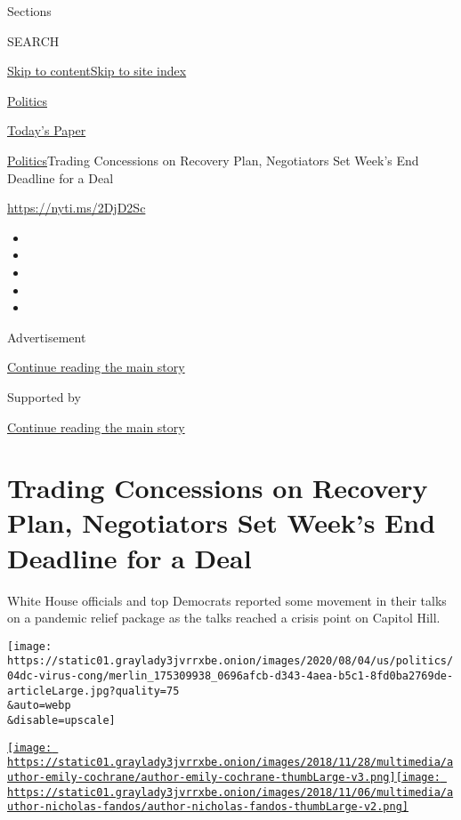 Sections

SEARCH

\protect\hyperlink{site-content}{Skip to
content}\protect\hyperlink{site-index}{Skip to site index}

\href{https://www.nytimes3xbfgragh.onion/section/politics}{Politics}

\href{https://myaccount.nytimes3xbfgragh.onion/auth/login?response_type=cookie\&client_id=vi}{}

\href{https://www.nytimes3xbfgragh.onion/section/todayspaper}{Today's
Paper}

\href{/section/politics}{Politics}\textbar{}Trading Concessions on
Recovery Plan, Negotiators Set Week's End Deadline for a Deal

\url{https://nyti.ms/2DjD2Sc}

\begin{itemize}
\item
\item
\item
\item
\item
\end{itemize}

Advertisement

\protect\hyperlink{after-top}{Continue reading the main story}

Supported by

\protect\hyperlink{after-sponsor}{Continue reading the main story}

\hypertarget{trading-concessions-on-recovery-plan-negotiators-set-weeks-end-deadline-for-a-deal}{%
\section{Trading Concessions on Recovery Plan, Negotiators Set Week's
End Deadline for a
Deal}\label{trading-concessions-on-recovery-plan-negotiators-set-weeks-end-deadline-for-a-deal}}

White House officials and top Democrats reported some movement in their
talks on a pandemic relief package as the talks reached a crisis point
on Capitol Hill.

\texttt{[image: https://static01.graylady3jvrrxbe.onion/images/2020/08/04/us/politics/04dc-virus-cong/merlin\_175309938\_0696afcb-d343-4aea-b5c1-8fd0ba2769de-articleLarge.jpg?quality=75\\\&auto=webp\\\&disable=upscale]}

\href{https://www.nytimes3xbfgragh.onion/by/emily-cochrane}{\texttt{[image: https://static01.graylady3jvrrxbe.onion/images/2018/11/28/multimedia/author-emily-cochrane/author-emily-cochrane-thumbLarge-v3.png]}}\href{https://www.nytimes3xbfgragh.onion/by/nicholas-fandos}{\texttt{[image: https://static01.graylady3jvrrxbe.onion/images/2018/11/06/multimedia/author-nicholas-fandos/author-nicholas-fandos-thumbLarge-v2.png]}}


